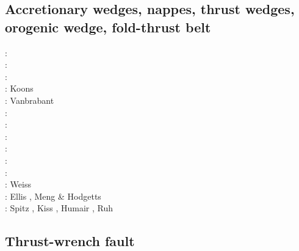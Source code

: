 \subsection{Accretionary wedges, nappes, thrust wedges, orogenic wedge, fold-thrust belt} 

\begin{scriptsize}
\nineteeneightythree: \cite{stoc83}\cite{dasd83}\\
\nineteeneightyfour: \cite{dahl84}\cite{dasd84}\\
\nineteenninety: \cite{dahl90}\\
\nineteenninetyfour: Koons \cite{koon94}\\
\nineteenninetynine: Vanbrabant \etal \cite{vajh99}\\
\twothousandthree: \cite{wiep03}\cite{smbs03}\cite{muso03}\cite{vamf03}\\
\twothousandsix: \cite{simp06}\cite{yabm06}\\
\twothousandtwelve: \cite{rukb12}\\
\twothousandthirteen: \cite{rugb13}\\
\twothousandsixteen: \cite{mauw16}\\
\twothousandseventeen: \cite{mauw17}\cite{rugb17}\\
\twothousandeighteen: Weiss \etal \cite{weib18}\\
\twothousandnineteen: Ellis \etal \cite{elgb19}, Meng \& Hodgetts \cite{meho19,meho19b}\\
\twothousandtwenty: Spitz \etal \cite{spsk20,spbe20}, Kiss \etal \cite{kids20}, 
                    Humair \etal \cite{hube20}, Ruh \cite{ruh20}
\end{scriptsize}

\subsection{Thrust-wrench fault} 

